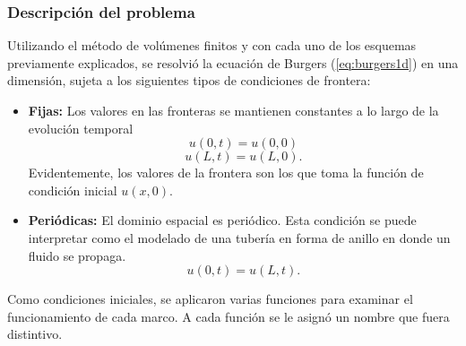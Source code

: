 \documentclass[12pt]{article}
\begin{document}
	\subsubsection{Descripción del problema}
	Utilizando el método de volúmenes finitos y con cada uno de los esquemas previamente explicados, se resolvió la ecuación de Burgers (\ref{eq:burgers1d}) en una dimensión, sujeta a los siguientes tipos de condiciones de frontera:
	\begin{itemize}
		\item \textbf{Fijas:} Los valores en las fronteras se mantienen constantes a lo largo de la evolución temporal
		\begin{equation}
			u(0,t) = u(0,0)
		\end{equation}
		\begin{equation}
			u(L, t) = u(L, 0).
		\end{equation}
		Evidentemente, los valores de la frontera son los que toma la función de condición inicial $u(x,0)$.
		\item \textbf{Periódicas:} El dominio espacial es periódico. Esta condición se puede interpretar como el modelado de una tubería en forma de anillo en donde un fluido se propaga.
		\begin{equation}
			u(0,t) = u(L, t).
		\end{equation}
	\end{itemize}
	Como condiciones iniciales, se aplicaron varias funciones para examinar el funcionamiento de cada marco. A cada función se le asignó un nombre que fuera distintivo.
\end{document}
